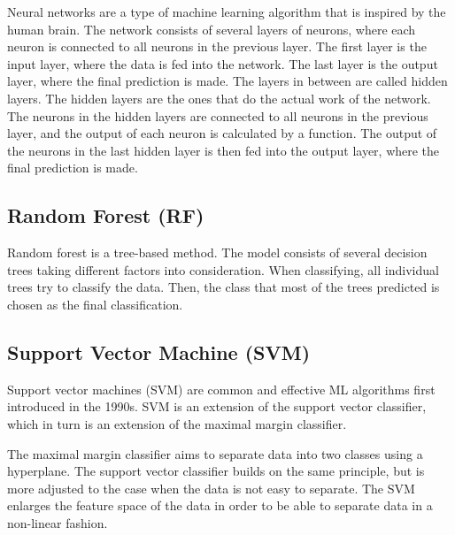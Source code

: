 \documentclass{kththesis}
\begin{document}
Neural networks are a type of machine learning algorithm that is inspired by the human brain. The network consists of several layers of neurons, where each neuron is connected to all neurons in the previous layer. The first layer is the input layer, where the data is fed into the network. The last layer is the output layer, where the final prediction is made. The layers in between are called hidden layers. The hidden layers are the ones that do the actual work of the network. The neurons in the hidden layers are connected to all neurons in the previous layer, and the output of each neuron is calculated by a function. The output of the neurons in the last hidden layer is then fed into the output layer, where the final prediction is made. \parencite{ibmWhatNeural}



\subsection{Random Forest (RF)}

Random forest is a tree-based method. The model consists of several decision trees taking different factors into consideration. When classifying, all individual trees try to classify the data. Then, the class that most of the trees predicted is chosen as the final classification. \parencite{ibmrforest}


\subsection{Support Vector Machine (SVM)}

Support vector machines (SVM) are common and effective ML algorithms first introduced in the 1990s. SVM is an extension of the support vector classifier, which in turn is an extension of the maximal margin classifier.

The maximal margin classifier aims to separate data into two classes using a hyperplane. The support vector classifier builds on the same principle, but is more adjusted to the case when the data is not easy to separate. The SVM enlarges the feature space of the data in order to be able to separate data in a non-linear fashion. \parencite{james2013introduction}
\end{document}
